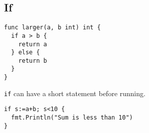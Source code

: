 \subsection{If}
\begin{lstlisting}
func larger(a, b int) int {
  if a > b {
    return a
  } else {
    return b
  }
}
\end{lstlisting}

\texttt{if} can have a short statement before running. 
\begin{lstlisting}
if s:=a+b; s<10 {
  fmt.Println("Sum is less than 10")
}
\end{lstlisting}

